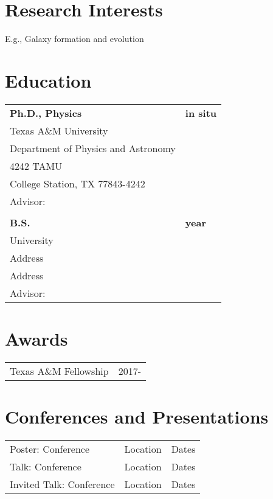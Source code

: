 \documentclass[9pt]{res} %
\begin{document}
\begin{resume}
 
\section{Research Interests}  
	E.g., Galaxy formation and evolution
	\section{Education}    
                 \begin{tabular}{ll}
                 {\bf Ph.D., Physics}  					  &  \hspace{2cm}  {\bf in situ}  \\
                 Texas A\&M University  				  &\\
                 Department of Physics and Astronomy	  &\\
                 4242 TAMU 						  &\\
                 College Station, TX 77843-4242 		  & \\
                 Advisor:  \\
                 \\
		
               {\bf B.S.}		 & \hspace{2cm} {\bf year} \\
               University	 & \\
               Address 						 & \\ 
               Address 					 & \\
               Advisor:  \\
               \end{tabular}
                  
\section{Awards}  
		\begin{tabular}{ll}
 		Texas A\&M  Fellowship  		& \hspace{3cm} 2017- \\
		\end{tabular}


\section{Conferences and Presentations}    
		\begin{tabular}{lll}
		Poster: Conference  & Location	& Dates \\
		Talk: Conference	& Location & Dates\\
		Invited Talk: Conference  & Location	& Dates\\
		\end{tabular}


\end{resume}
\end{document}
